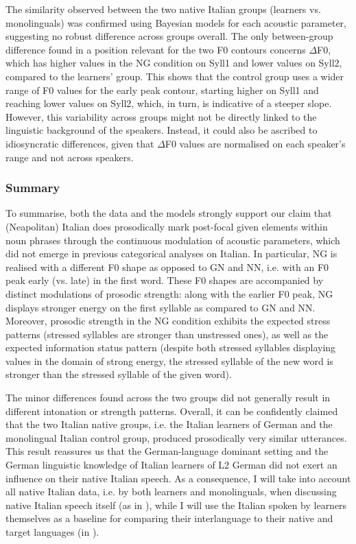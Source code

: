 The similarity observed between the two native Italian groups (learners vs. monolinguals) was confirmed using Bayesian models for each acoustic parameter, suggesting no robust difference across groups overall. The only between-group difference found in a position relevant for the two F0 contours concerns ${\Delta}$F0, which has higher values in the NG condition on Syll1 and lower values on Syll2, compared to the learners’ group. This shows that the control group uses a wider range of F0 values for the early peak contour, starting higher on Syll1 and reaching lower values on Syll2, which, in turn, is indicative of a steeper slope. However, this variability across groups might not be directly linked to the linguistic background of the speakers. Instead, it could also be ascribed to idiosyncratic differences, given that ${\Delta}$F0 values are normalised on each speaker’s range and not across speakers.

\subsubsection{Summary}
\hypertarget{Toc191305899}{}
To summarise, both the data and the models strongly support our claim that (Neapolitan) Italian does prosodically mark post-focal given elements within noun phrases through the continuous modulation of acoustic parameters, which did not emerge in previous categorical analyses on Italian. In particular, NG is realised with a different F0 shape as opposed to GN and NN, i.e. with an F0 peak early (vs. late) in the first word. These F0 shapes are accompanied by distinct modulations of prosodic strength: along with the earlier F0 peak, NG displays stronger energy on the first syllable as compared to GN and NN. Moreover, prosodic strength in the NG condition exhibits the expected stress patterns (stressed syllables are stronger than unstressed ones), as well as the expected information status pattern (despite both stressed syllables displaying values in the domain of strong energy, the stressed syllable of the new word is stronger than the stressed syllable of the given word).

The minor differences found across the two groups did not generally result in different intonation or strength patterns. Overall, it can be confidently claimed that the two Italian native groups, i.e. the Italian learners of German and the monolingual Italian control group, produced prosodically very similar utterances. This result reassures us that the German-language dominant setting and the German linguistic knowledge of Italian learners of L2 German did not exert an influence on their native Italian speech. As a consequence, I will take into account all native Italian data, i.e. by both learners and monolinguals, when discussing native Italian speech itself (as in ), while I will use the Italian spoken by learners themselves as a baseline for comparing their interlanguage to their native and target languages (in ).


